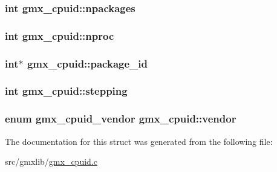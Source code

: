 \hypertarget{structgmx__cpuid_a93ebc21ce5a96d0066df5c08ae3b8ebf}{
\subsubsection[{npackages}]{\setlength{\rightskip}{0pt plus 5cm}int {\bf gmx\-\_\-cpuid\-::npackages}}}\label{structgmx__cpuid_a93ebc21ce5a96d0066df5c08ae3b8ebf}
\hypertarget{structgmx__cpuid_a0d5d66df033fcb261105faf61517824e}{
\subsubsection[{nproc}]{\setlength{\rightskip}{0pt plus 5cm}int {\bf gmx\-\_\-cpuid\-::nproc}}}\label{structgmx__cpuid_a0d5d66df033fcb261105faf61517824e}
\hypertarget{structgmx__cpuid_aa7adf6d90a81704fda5095bfe7a67e6c}{
\subsubsection[{package\-\_\-id}]{\setlength{\rightskip}{0pt plus 5cm}int$\ast$ {\bf gmx\-\_\-cpuid\-::package\-\_\-id}}}\label{structgmx__cpuid_aa7adf6d90a81704fda5095bfe7a67e6c}
\hypertarget{structgmx__cpuid_a1bef8166bf64e18883c1b94f7f87e98b}{
\subsubsection[{stepping}]{\setlength{\rightskip}{0pt plus 5cm}int {\bf gmx\-\_\-cpuid\-::stepping}}}\label{structgmx__cpuid_a1bef8166bf64e18883c1b94f7f87e98b}
\hypertarget{structgmx__cpuid_a852182f7412b394d2ec3da6bca3309d8}{
\subsubsection[{vendor}]{\setlength{\rightskip}{0pt plus 5cm}enum {\bf gmx\-\_\-cpuid\-\_\-vendor} {\bf gmx\-\_\-cpuid\-::vendor}}}\label{structgmx__cpuid_a852182f7412b394d2ec3da6bca3309d8}


\-The documentation for this struct was generated from the following file\-:\begin{DoxyCompactItemize}
\item 
src/gmxlib/\hyperlink{gmx__cpuid_8c}{gmx\-\_\-cpuid.\-c}\end{DoxyCompactItemize}
